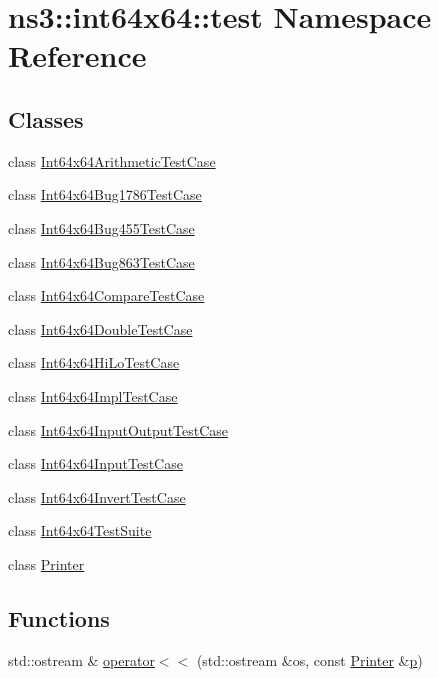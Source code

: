 \hypertarget{namespacens3_1_1int64x64_1_1test}{}\section{ns3\+:\+:int64x64\+:\+:test Namespace Reference}
\label{namespacens3_1_1int64x64_1_1test}
\subsection*{Classes}
\begin{DoxyCompactItemize}
\item 
class \hyperlink{classns3_1_1int64x64_1_1test_1_1Int64x64ArithmeticTestCase}{Int64x64\+Arithmetic\+Test\+Case}
\item 
class \hyperlink{classns3_1_1int64x64_1_1test_1_1Int64x64Bug1786TestCase}{Int64x64\+Bug1786\+Test\+Case}
\item 
class \hyperlink{classns3_1_1int64x64_1_1test_1_1Int64x64Bug455TestCase}{Int64x64\+Bug455\+Test\+Case}
\item 
class \hyperlink{classns3_1_1int64x64_1_1test_1_1Int64x64Bug863TestCase}{Int64x64\+Bug863\+Test\+Case}
\item 
class \hyperlink{classns3_1_1int64x64_1_1test_1_1Int64x64CompareTestCase}{Int64x64\+Compare\+Test\+Case}
\item 
class \hyperlink{classns3_1_1int64x64_1_1test_1_1Int64x64DoubleTestCase}{Int64x64\+Double\+Test\+Case}
\item 
class \hyperlink{classns3_1_1int64x64_1_1test_1_1Int64x64HiLoTestCase}{Int64x64\+Hi\+Lo\+Test\+Case}
\item 
class \hyperlink{classns3_1_1int64x64_1_1test_1_1Int64x64ImplTestCase}{Int64x64\+Impl\+Test\+Case}
\item 
class \hyperlink{classns3_1_1int64x64_1_1test_1_1Int64x64InputOutputTestCase}{Int64x64\+Input\+Output\+Test\+Case}
\item 
class \hyperlink{classns3_1_1int64x64_1_1test_1_1Int64x64InputTestCase}{Int64x64\+Input\+Test\+Case}
\item 
class \hyperlink{classns3_1_1int64x64_1_1test_1_1Int64x64InvertTestCase}{Int64x64\+Invert\+Test\+Case}
\item 
class \hyperlink{classns3_1_1int64x64_1_1test_1_1Int64x64TestSuite}{Int64x64\+Test\+Suite}
\item 
class \hyperlink{classns3_1_1int64x64_1_1test_1_1Printer}{Printer}
\end{DoxyCompactItemize}
\subsection*{Functions}
\begin{DoxyCompactItemize}
\item 
std\+::ostream \& \hyperlink{namespacens3_1_1int64x64_1_1test_a9a3de58e74671ced4615b1dc76e4f4e5}{operator$<$$<$} (std\+::ostream \&os, const \hyperlink{classns3_1_1int64x64_1_1test_1_1Printer}{Printer} \&\hyperlink{lte__link__budget__x2__handover__measures_8m_ac9de518908a968428863f829398a4e62}{p})
\end{DoxyCompactItemize}
